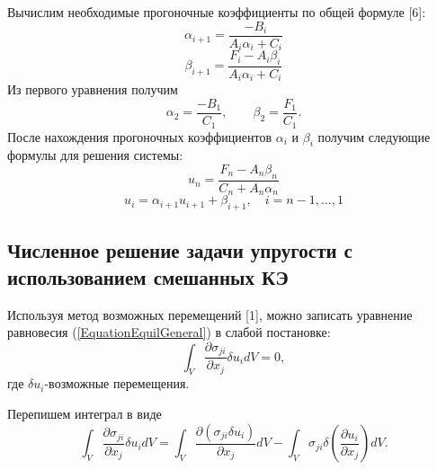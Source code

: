 \documentclass[a4paper,14pt]{extarticle}
\begin{document}
Вычислим необходимые прогоночные коэффициенты по общей формуле [6]:
\[
\alpha_{i+1}=\frac{-B_i}{A_i \alpha_i +C_i}
\]
\[
\beta_{i+1}=\frac{F_i-A_i \beta_i}{A_i \alpha_i +C_i}
\]
Из первого уравнения получим 
\[
\alpha_2=\frac{-B_1}{C_1}, \qquad \beta_2=\frac{F_1}{C_1}.
\]
После нахождения прогоночных коэффициентов $\alpha_{i}$ и $\beta_{i}$ получим следующие формулы для решения системы:
\[
u_n=\frac{F_n-A_n \beta_n}{C_n+A_n \alpha_n}
\]
\[
u_i=\alpha_{i+1} u_{i+1} + \beta_{i+1}, \quad i=n-1,\ldots,1
\]

\newpage

\subsection{Численное решение задачи упругости с использованием смешанных КЭ}
\normalsize
Используя метод возможных перемещений [1], можно записать уравнение равновесия (\ref{EquationEquilGeneral}) в слабой постановке: 
\begin{equation*}
\int_{V} \frac{\partial \sigma_{ji}}{\partial x_{j}} \delta u_{i} dV=0,
\end{equation*}
где $\delta u_i$-возможные перемещения.

Перепишем интеграл в виде
\begin{equation*}
\int_{V} \frac{\partial \sigma_{ji}}{\partial x_{j}} \delta u_{i} dV=\int_{V} \frac{\partial (\sigma_{ji} \delta u_{i})}{\partial x_{j}}dV-\int_{V} \sigma_{ji} \delta (\frac{\partial u_i}{\partial x_{j}})dV.
\end{equation*}
\end{document}
